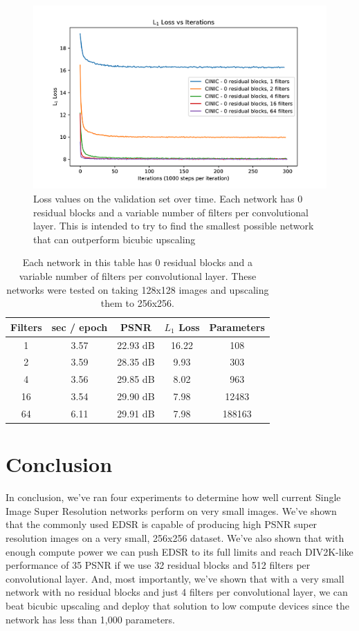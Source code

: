 \documentclass[conference]{IEEEtran}
\begin{document}
\begin{figure}[htbp]
  \centerline{\includegraphics{min-loss.png}}
  \caption{Loss values on the validation set over time. Each network has 0 residual blocks and a variable number of filters per convolutional layer. This is intended to try to find the smallest possible network that can outperform bicubic upscaling}
  \label{fig:min-loss}
\end{figure}

\begin{table}[htbp]
  \centering
  \caption{Each network in this table has 0 residual blocks and a variable number of filters per convolutional layer. These networks were tested on taking 128x128 images and upscaling them to 256x256.}
  \label{tab:min}
  \begin{tabular}{c|c|c|c|c}
    Filters & sec / epoch & PSNR     & $L_1$ Loss & Parameters \\ \hline
    1       & 3.57        & 22.93 dB & 16.22      & 108        \\
    2       & 3.59        & 28.35 dB & 9.93       & 303        \\
    4       & 3.56        & 29.85 dB & 8.02       & 963        \\
    16      & 3.54        & 29.90 dB & 7.98       & 12483      \\
    64      & 6.11        & 29.91 dB & 7.98       & 188163     \\
  \end{tabular}
\end{table}

\section{Conclusion}
In conclusion, we've ran four experiments to determine how well current Single Image Super Resolution networks perform on very small images.
We've shown that the commonly used EDSR is capable of producing high PSNR super resolution images on a very small, 256x256 dataset.
We've also shown that with enough compute power we can push EDSR to its full limits and reach DIV2K-like performance of 35 PSNR if we use 32 residual blocks and 512 filters per convolutional layer.
And, most importantly, we've shown that with a very small network with no residual blocks and just 4 filters per convolutional layer, we can beat bicubic upscaling and deploy that solution to low compute devices since the network has less than 1,000 parameters.
\end{document}
